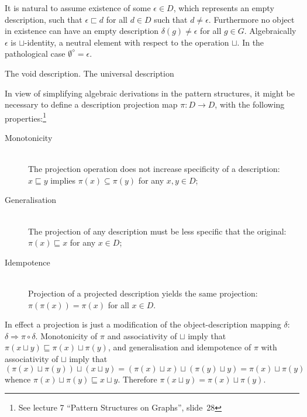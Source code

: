 \documentclass[a4paper]{article}
\newcommand{\brac}[1]{{\left ( #1 \right )}}
\begin{document}
It is natural to assume existence of some $\epsilon \in D$, which represents an empty description, such that $\epsilon \sqsubset d$ for all $d\in D$ such that $d\neq \epsilon$. Furthermore no object in existence can have an empty description $\delta(g)\neq \epsilon$ for all $g\in G$. Algebraically $\epsilon$ is $\sqcup$-identity, a neutral element with respect to the operation $\sqcup$. In the pathological case $\emptyset^\diamond=\epsilon$.

The void description. The universal description




In view of simplifying algebraic derivations in the pattern structures, it might be necessary to define a description projection map $\pi:D\to D$, with the following properties:\footnote{See lecture 7 ``Pattern Structures on Graphs'', slide~28} \begin{description}
	\item[Monotonicity] \hfill \\ The projection operation does not increase specificity of a description: $x\sqsubseteq y$ implies $\pi(x)\subseteq \pi(y)$ for any $x,y\in D$;
	\item[Generalisation] \hfill \\ The projection of any description must be less specific that the original: $\pi(x)\sqsubseteq x$ for any $x\in D$;
	\item[Idempotence] \hfill \\ Projection of a projected description yields the same projection: $\pi\brac{\pi(x)} = \pi(x)$ for all $x\in D$.
\end{description}
In effect a projection is just a modification of the object-description mapping $\delta$: $\delta \Rightarrow \pi \circ \delta$. Monotonicity of $\pi$ and associativity of $\sqcup$ imply that $\pi\brac{x\sqcup y}\sqsubseteq \pi(x)\sqcup\pi(y)$, and generalisation and idempotence of $\pi$ with associativity of $\sqcup$ imply that \[\brac{\pi(x)\sqcup\pi(y)}\sqcup (x\sqcup y) = \brac{\pi(x)\sqcup x}\sqcup \brac{\pi(y)\sqcup y} = \pi(x)\sqcup \pi(y)\] whence $\pi(x)\sqcup\pi(y)\sqsubseteq x\sqcup y$. Therefore $\pi\brac{x\sqcup y} = \pi(x)\sqcup\pi(y)$.



\end{document}
